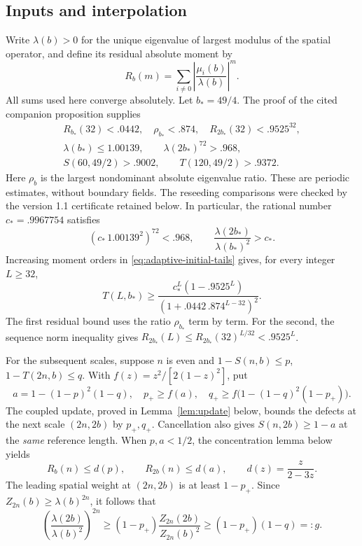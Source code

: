 \documentclass[11pt,a4paper]{article}
\begin{document}
\subsection{Inputs and interpolation}
Write $\lambda(b)>0$ for the unique eigenvalue of largest modulus of
the spatial operator, and define its residual absolute moment by
\[
 R_b(m)=\sum_{i\ne0}\left|\frac{\mu_i(b)}{\lambda(b)}\right|^m.
\]
All sums used here converge absolutely. Let $b_*=49/4$.
The proof of the cited companion proposition supplies
\begin{gather}
 R_{b_*}(32)<.0442,\quad \rho_{b_*}<.874,\quad
 R_{2b_*}(32)<.9525^{32},\label{eq:adaptive-initial-tails}\\
 \lambda(b_*)\le1.00139,\qquad
 \lambda(2b_*)^{72}>.968,\label{eq:adaptive-initial-leading}\\
 S(60,49/2)>.9002,\qquad T(120,49/2)>.9372.
 \label{eq:adaptive-seeds}
\end{gather}
Here $\rho_b$ is the largest nondominant absolute eigenvalue ratio.
These are periodic estimates, without boundary fields. The reseeding
comparisons were checked by the version 1.1 certificate retained below.
In particular, the rational number $c_*=.9967754$ satisfies
\[
 (c_*\,1.00139^2)^{72}<.968,
 \qquad \frac{\lambda(2b_*)}{\lambda(b_*)^2}>c_*.
\]
Increasing moment orders in \eqref{eq:adaptive-initial-tails} gives,
for every integer $L\ge32$,
\begin{equation}\label{eq:adaptive-short}
 T(L,b_*)\ge
 \frac{c_*^L(1-.9525^L)}{(1+.0442\,.874^{L-32})^2}.
\end{equation}
The first residual bound uses the ratio $\rho_{b_*}$ term by term.
For the second, the sequence norm inequality gives
$R_{2b_*}(L)\le R_{2b_*}(32)^{L/32}<.9525^L$.

For the subsequent scales, suppose $n$ is even and
$1-S(n,b)\le p$, $1-T(2n,b)\le q$.
With $f(z)=z^2/[2(1-z)^2]$, put
\begin{equation}\label{eq:adaptive-update}
 a=1-(1-p)^2(1-q),\quad
 p_+\ge f(a),\quad
 q_+\ge f\bigl(1-(1-q)^2(1-p_+)\bigr).
\end{equation}
The coupled update, proved in Lemma~\ref{lem:update} below, bounds the
defects at the next scale $(2n,2b)$ by $p_+,q_+$.
Cancellation also gives $S(n,2b)\ge1-a$ at the \emph{same} reference
length. When $p,a<1/2$, the concentration lemma below yields
\[
 R_b(n)\le d(p),\qquad R_{2b}(n)\le d(a),\qquad
 d(z)=\frac{z}{2-3z}.
\]
The leading spatial weight at $(2n,2b)$ is at least $1-p_+$.
Since $Z_{2n}(b)\ge\lambda(b)^{2n}$, it follows that
\begin{equation}\label{eq:adaptive-ratio}
 \left(\frac{\lambda(2b)}{\lambda(b)^2}\right)^{2n}
 \ge(1-p_+)\frac{Z_{2n}(2b)}{Z_{2n}(b)^2}
 \ge(1-p_+)(1-q)=:g.
\end{equation}
\end{document}
